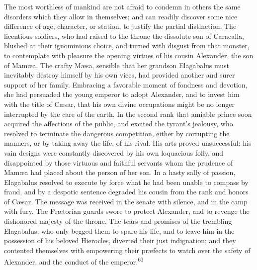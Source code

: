 The most worthless of mankind are not afraid to condemn in others
the same disorders which they allow in themselves; and can
readily discover some nice difference of age, character, or
station, to justify the partial distinction. The licentious
soldiers, who had raised to the throne the dissolute son of
Caracalla, blushed at their ignominious choice, and turned with
disgust from that monster, to contemplate with pleasure the
opening virtues of his cousin Alexander, the son of Mamæa. The
crafty Mæsa, sensible that her grandson Elagabalus must
inevitably destroy himself by his own vices, had provided another
and surer support of her family. Embracing a favorable moment of
fondness and devotion, she had persuaded the young emperor to
adopt Alexander, and to invest him with the title of Cæsar, that
his own divine occupations might be no longer interrupted by the
care of the earth. In the second rank that amiable prince soon
acquired the affections of the public, and excited the tyrant’s
jealousy, who resolved to terminate the dangerous competition,
either by corrupting the manners, or by taking away the life, of
his rival. His arts proved unsuccessful; his vain designs were
constantly discovered by his own loquacious folly, and
disappointed by those virtuous and faithful servants whom the
prudence of Mamæa had placed about the person of her son. In a
hasty sally of passion, Elagabalus resolved to execute by force
what he had been unable to compass by fraud, and by a despotic
sentence degraded his cousin from the rank and honors of Cæsar.
The message was received in the senate with silence, and in the
camp with fury. The Prætorian guards swore to protect Alexander,
and to revenge the dishonored majesty of the throne. The tears
and promises of the trembling Elagabalus, who only begged them to
spare his life, and to leave him in the possession of his beloved
Hierocles, diverted their just indignation; and they contented
themselves with empowering their præfects to watch over the
safety of Alexander, and the conduct of the emperor.\textsuperscript{61}



